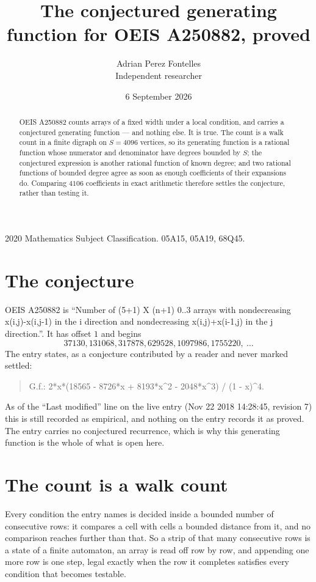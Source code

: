 \documentclass[11pt,a4paper]{article}
\title{The conjectured generating function for OEIS A250882, proved}
\author{Adrian Perez Fontelles\\ \small Independent researcher}
\date{6 September 2026}
\theoremstyle{plain}
\theoremstyle{definition}
\begin{document}
\maketitle

\begin{abstract}
OEIS A250882 counts arrays of a fixed width under a local condition, and carries a conjectured
generating function --- and nothing else. It is true. The count is a walk count in a finite
digraph on $S=4096$ vertices, so its generating function is a rational function whose numerator
and denominator have degrees bounded by $S$; the conjectured expression is another rational
function of known degree; and two rational functions of bounded degree agree as soon as enough
coefficients of their expansions do. Comparing $4106$ coefficients in exact arithmetic
therefore settles the conjecture, rather than testing it.
\end{abstract}

\noindent\small 2020 Mathematics Subject Classification. 05A15, 05A19, 68Q45.\normalsize

\section{The conjecture}

OEIS A250882 is ``Number of (5+1) X (n+1) 0..3 arrays with nondecreasing x(i,j)-x(i,j-1) in the i direction and nondecreasing x(i,j)+x(i-1,j) in the j direction.''. It has offset $1$ and begins
\[
37130, 131068, 317878, 629528, 1097986, 1755220,\ \dots
\]
The entry states, as a conjecture contributed by a reader and never marked settled:
\begin{quote}
G.f.: 2*x*(18565 - 8726*x + 8193*x\^{}2 - 2048*x\^{}3) / (1 - x)\^{}4.
\end{quote}
As of the ``Last modified'' line on the live entry (Nov 22 2018 14:28:45, revision 7) this is still
recorded as empirical, and nothing on the entry records it as proved. The entry carries no
conjectured recurrence, which is why this generating function is the whole of what is open
here.

\section{The count is a walk count}

Every condition the entry names is decided inside a bounded number of consecutive rows: it
compares a cell with cells a bounded distance from it, and no comparison reaches further than
that. So a strip of that many consecutive rows is a state of a finite automaton, an array is
read off row by row, and appending one more row is one step, legal exactly when the row it
completes satisfies every condition that becomes testable.
\end{document}
